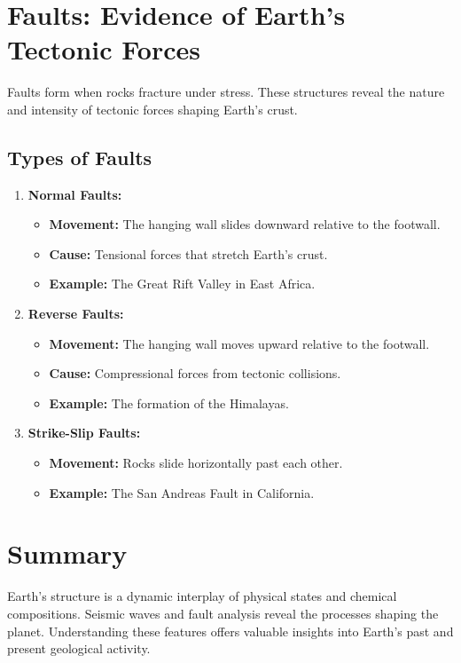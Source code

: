 \documentclass{article}
\begin{document}
\section*{Faults: Evidence of Earth's Tectonic Forces}

Faults form when rocks fracture under stress. These structures reveal the nature and intensity of tectonic forces shaping Earth's crust.

\subsection*{Types of Faults}
\begin{enumerate}
    \item \textbf{Normal Faults:}
        \begin{itemize}
            \item \textbf{Movement:} The hanging wall slides downward relative to the footwall.
            \item \textbf{Cause:} Tensional forces that stretch Earth's crust.
            \item \textbf{Example:} The Great Rift Valley in East Africa.
        \end{itemize}
    \item \textbf{Reverse Faults:}
        \begin{itemize}
            \item \textbf{Movement:} The hanging wall moves upward relative to the footwall.
            \item \textbf{Cause:} Compressional forces from tectonic collisions.
            \item \textbf{Example:} The formation of the Himalayas.
        \end{itemize}
    \item \textbf{Strike-Slip Faults:}
        \begin{itemize}
            \item \textbf{Movement:} Rocks slide horizontally past each other.
            \item \textbf{Example:} The San Andreas Fault in California.
        \end{itemize}
\end{enumerate}

\section*{Summary}

Earth's structure is a dynamic interplay of physical states and chemical compositions. Seismic waves and fault analysis reveal the processes shaping the planet. Understanding these features offers valuable insights into Earth's past and present geological activity.
\end{document}

